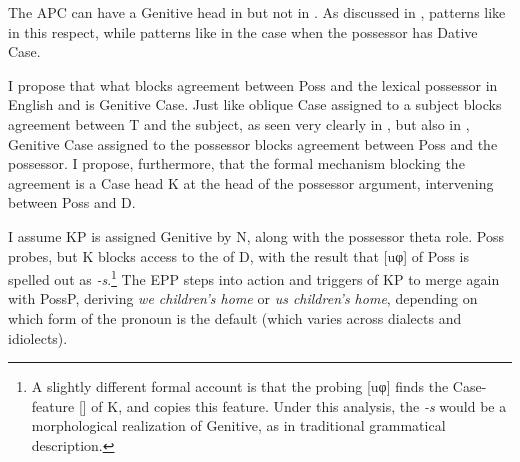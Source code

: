 \documentclass[output=paper]{langsci/langscibook}
\begin{document}
The \gls{APC} can have a Genitive head in  but not in . As
discussed in ,  patterns like  in this
respect, while  patterns like  in the case when the possessor
has Dative Case.

I propose that what blocks agreement between Poss and the lexical possessor in
English and  is Genitive Case. Just like oblique Case
assigned to a subject blocks agreement between T and the subject, as seen very
clearly in  \citep{Thrainsson2007}, but also in 
\parencites{LaitinenVilkuna1993}[209--210]{Holmberg2010b}, Genitive Case assigned to the possessor blocks agreement between Poss and the
possessor. I propose, furthermore, that the formal mechanism blocking the
agreement is a Case head K at the head of the possessor argument, intervening
between Poss and D.

\ea\label{ex:key:16.45}
\z

I assume KP is assigned Genitive by N, along with the possessor theta role.
Poss probes, but K blocks access to the  of D, with the result that
[uφ] of Poss is spelled out as \emph{-s}.\footnote{ A slightly different formal
account is that the probing [uφ] finds the Case-feature [\Gen{}] of K, and
copies this feature. Under this analysis, the \emph{-s} would be a
morphological realization of Genitive, as in traditional grammatical
description.} The \gls{EPP} steps into action and triggers  of KP to merge
again with PossP, deriving \emph{we children’s home} or \emph{us children’s
home}, depending on which form of the pronoun is the default (which varies
across dialects and idiolects).
\end{document}
